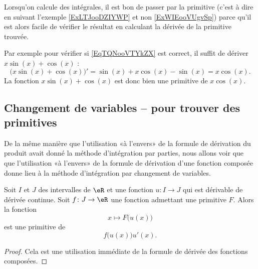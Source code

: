 \begin{remark}
    Lorsqu'on calcule des intégrales, il est bon de passer par la primitive (c'est à dire en suivant l'exemple \ref{ExLTJooDZIYWP} et non \ref{ExWIEooVUgvSp}) parce qu'il est alors facile de vérifier le résultat en calculant la dérivée de la primitive trouvée.
     
    Par exemple pour vérifier si \eqref{EqTQNooVTYkZX} est correct, il suffit de dériver \( x\sin(x)+\cos(x)\) :
    \begin{equation}
        \big( x\sin(x)+\cos(x) \big)'=\sin(x)+x\cos(x)-\sin(x)=x\cos(x).
    \end{equation}
    La fonction \( x\sin(x)+\cos(x)\) est donc bien une primitive de \( x\cos(x)\).
\end{remark}


\subsection{Changement de variables -- pour trouver des primitives}

De la même manière que l'utilisation «à l'envers» de la formule de dérivation du produit avait donné la méthode d'intégration par parties, nous allons voir que que l'utilisation «à l'envers» de la formule de dérivation d'une fonction composée donne lieu à la méthode d'intégration par changement de variables.
\begin{proposition}
    Soit \( I\) et \( J\) des intervalles de \( \eR\) et une fonction \( u\colon I\to J\) qui est dérivable de dérivée continue. Soit \( f\colon J\to \eR\) une fonction admettant une primitive \( F\). Alors la fonction
    \begin{equation}
        x\mapsto F\big( u(x) \big)
    \end{equation}
    est une primitive de
    \begin{equation}\label{changvar}
        f\big( u(x) \big)u'(x).
    \end{equation}
\end{proposition}

\begin{proof}
    Cela est une utilisation immédiate de la formule de dérivée des fonctions composées.
\end{proof}

